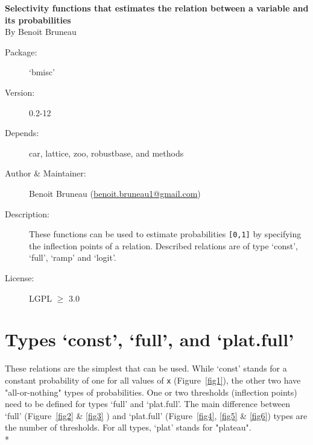 \documentclass[letterpaper, 12pt]{article}
\begin{document}
\begin{titlepage}
\vspace*{3cm}
\begin{center}

\huge{\bf Selectivity functions that estimates the relation between a variable and its probabilities}\\

\vspace*{2cm}
\large{By Benoit Bruneau}
\end{center}
\vspace*{4cm}

\begin{description}
\item[Package:] `bmisc'
\item[Version:] 0.2-12
\item[Depends:] car, lattice, zoo, robustbase, and methods
\item[Author \& Maintainer:] Benoit Bruneau (\href{mailto:benoit.bruneau1@gmail.com}{benoit.bruneau1@gmail.com})
\item[Description:] These functions can be used to estimate probabilities \verb=[0,1]= by specifying the inflection points of a relation. Described relations are of type `const', `full', `ramp' and `logit'.
\item[License:] LGPL $\geqslant$ 3.0
\end{description}


\vspace*{\fill}


\end{titlepage}

\tableofcontents
\newpage

\section{Types `const', `full', and `plat.full'}
\noindent These relations are the simplest that can be used. While `const' stands for a constant probability of one for all 
values of \verb#x# (Figure~\ref{fig1}), the other two have "all-or-nothing" types of probabilities. One or two thresholds 
(inflection points) need to be defined for types `full' and `plat.full'. The main difference between `full'
(Figure~\ref{fig2} \& \ref{fig3} ) 
and `plat.full' (Figure~\ref{fig4}, \ref{fig5} \& \ref{fig6}) types are the number of thresholds. For all types, `plat' stands for "plateau".\\*
\end{document}

